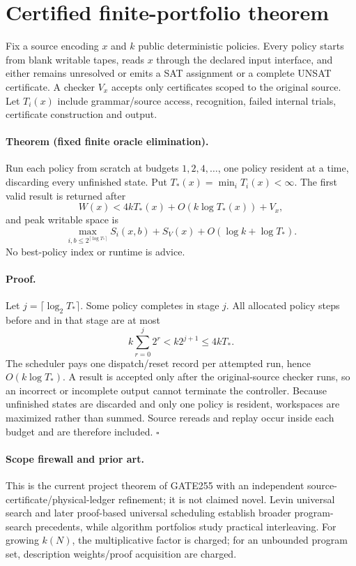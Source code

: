 \documentclass[11pt]{article}
\begin{document}
\section{Certified finite-portfolio theorem}
Fix a source encoding $x$ and $k$ public deterministic policies.  Every
policy starts from blank writable tapes, reads $x$ through the declared input
interface, and either remains unresolved or emits a SAT assignment or a
complete UNSAT certificate.  A checker $V_x$ accepts only certificates scoped
to the original source.  Let $T_i(x)$ include grammar/source access,
recognition, failed internal trials, certificate construction and output.

\paragraph{Theorem (fixed finite oracle elimination).}
Run each policy from scratch at budgets $1,2,4,\ldots$, one policy resident at
a time, discarding every unfinished state.  Put
$T_*(x)=\min_i T_i(x)<\infty$.  The first valid result is returned after
\[
 W(x)<4kT_*(x)+O(k\log T_*(x))+V_x,
\]
and peak writable space is
\[
 \max_{i,b\le2^{\lceil\log T_*\rceil}}S_i(x,b)
 +S_V(x)+O(\log k+\log T_*).
\]
No best-policy index or runtime is advice.

\paragraph{Proof.}
Let $j=\lceil\log_2T_*\rceil$.  Some policy completes in stage $j$.
All allocated policy steps before and in that stage are at most
\[
k\sum_{r=0}^{j}2^r<k2^{j+1}\le4kT_*.
\]
The scheduler pays one dispatch/reset record per attempted run, hence
$O(k\log T_*)$.  A result is accepted only after the original-source checker
runs, so an incorrect or incomplete output cannot terminate the controller.
Because unfinished states are discarded and only one policy is resident,
workspaces are maximized rather than summed.  Source rereads and replay occur
inside each budget and are therefore included. \hfill$\square$

\paragraph{Scope firewall and prior art.}
This is the current project theorem of GATE255 with an independent
source-certificate/physical-ledger refinement; it is not claimed novel.
Levin universal search and later proof-based universal scheduling establish
broader program-search precedents, while algorithm portfolios study practical
interleaving.  For growing $k(N)$, the multiplicative factor is charged; for
an unbounded program set, description weights/proof acquisition are charged.
\end{document}
